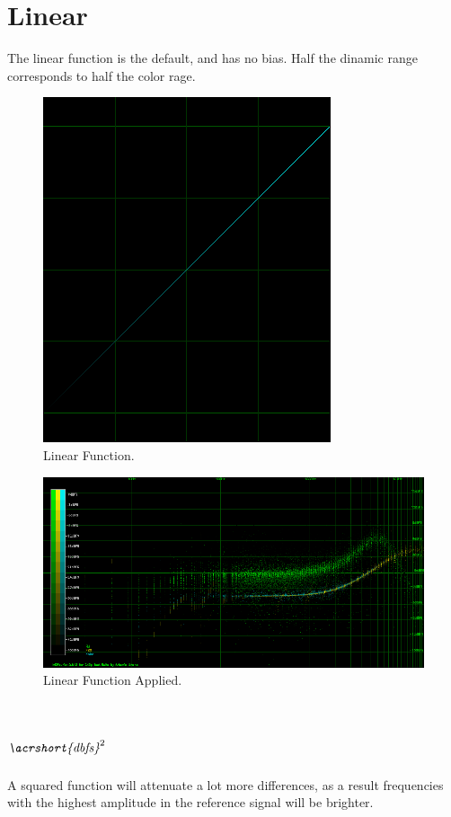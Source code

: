 \documentclass[10pt,a4paper]{report}
\begin{document}
\begin{appendices}
\section{Linear} 

The linear function is the default, and has no bias. Half the dinamic range corresponds to half the color rage.

\begin{figure}[H]
	\centering
	\includegraphics[width=0.4\linewidth]{images/colorfilter/BetaFunctionPlot_3.png}
	\caption[Linear]{Linear Function.}
	\label{fig:betafunctionplot3}
\end{figure}

\begin{figure}[H]
	\centering
	\includegraphics[width=1\linewidth]{images/colorfilter/BetaFunctionPlot_3_Data.png}
	\caption[Linear Applied]{Linear Function Applied.}
	\label{fig:betafunctionplot3data}
\end{figure}

\section{$\textit{\acrshort{dbfs}}^2$}

A squared function will attenuate a lot more differences, as a result frequencies with the highest amplitude in the reference signal will be brighter.


\end{appendices}
\end{document}
